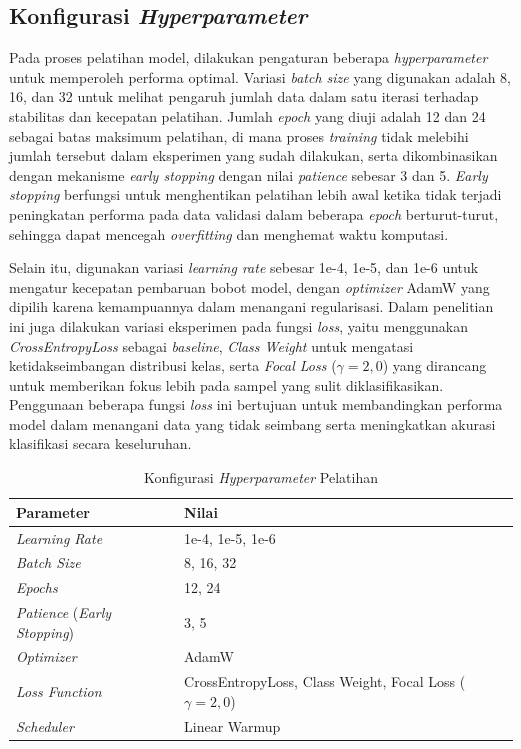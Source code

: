 \subsection{Konfigurasi \textit{Hyperparameter}} \label{IV.Model.Hyperparameter}

Pada proses pelatihan model, dilakukan pengaturan beberapa \textit{hyperparameter} untuk memperoleh performa optimal. Variasi \textit{batch size} yang digunakan adalah 8, 16, dan 32 untuk melihat pengaruh jumlah data dalam satu iterasi terhadap stabilitas dan kecepatan pelatihan. Jumlah \textit{epoch} yang diuji adalah 12 dan 24 sebagai batas maksimum pelatihan, di mana proses \textit{training} tidak melebihi jumlah tersebut dalam eksperimen yang sudah dilakukan, serta dikombinasikan dengan mekanisme \textit{early stopping} dengan nilai \textit{patience} sebesar 3 dan 5. \textit{Early stopping} berfungsi untuk menghentikan pelatihan lebih awal ketika tidak terjadi peningkatan performa pada data validasi dalam beberapa \textit{epoch} berturut-turut, sehingga dapat mencegah \textit{overfitting} dan menghemat waktu komputasi.

Selain itu, digunakan variasi \textit{learning rate} sebesar 1e-4, 1e-5, dan 1e-6 untuk mengatur kecepatan pembaruan bobot model, dengan \textit{optimizer} AdamW yang dipilih karena kemampuannya dalam menangani regularisasi. Dalam penelitian ini juga dilakukan variasi eksperimen pada fungsi \textit{loss}, yaitu menggunakan \textit{CrossEntropyLoss} sebagai \textit{baseline}, \textit{Class Weight} untuk mengatasi ketidakseimbangan distribusi kelas, serta \textit{Focal Loss} ($\gamma = 2{,}0$) yang dirancang untuk memberikan fokus lebih pada sampel yang sulit diklasifikasikan. Penggunaan beberapa fungsi \textit{loss} ini bertujuan untuk membandingkan performa model dalam menangani data yang tidak seimbang serta meningkatkan akurasi klasifikasi secara keseluruhan.

\begin{table}[H]
    \centering
    \caption{Konfigurasi \textit{Hyperparameter} Pelatihan}
    \label{table:4.hyperparams}
    \small
    \setlength{\tabcolsep}{3pt}
    \renewcommand{\arraystretch}{1.1}
    \begin{tabular}{p{4.0cm} p{3.5cm}}
        \hline
        \textbf{Parameter} & \textbf{Nilai} \\
        \hline
        \textit{Learning Rate} & 1e-4, 1e-5, 1e-6 \\
        \textit{Batch Size} & 8, 16, 32 \\
        \textit{Epochs} & 12, 24 \\
        \textit{Patience} (\textit{Early Stopping}) & 3, 5 \\
        \textit{Optimizer} & AdamW \\
        \textit{Loss Function} & CrossEntropyLoss, Class Weight, Focal Loss ($\gamma = 2{,}0$) \\
        \textit{Scheduler} & Linear Warmup \\
        \hline
    \end{tabular}
\end{table}

